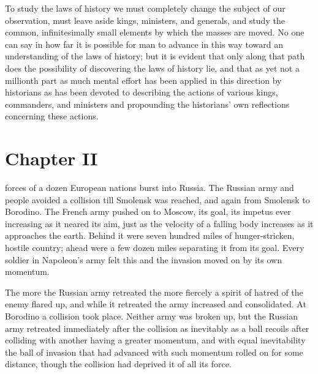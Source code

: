 To study the laws of history we must completely change the
subject of our observation, must leave aside kings, ministers,
and generals, and study the common, infinitesimally small
elements by which the masses are moved. No one can say in how far
it is possible for man to advance in this way toward an
understanding of the laws of history; but it is evident that only
along that path does the possibility of discovering the laws of
history lie, and that as yet not a millionth part as much mental
effort has been applied in this direction by historians as has
been devoted to describing the actions of various kings,
commanders, and ministers and propounding the historians' own
reflections concerning these actions.


\chapter*{Chapter II} \ifaudio {}
\fi

 forces of a dozen European nations burst into Russia. The
Russian army and people avoided a collision till Smolensk was
reached, and again from Smolensk to Borodino. The French army
pushed on to Moscow, its goal, its impetus ever increasing as it
neared its aim, just as the velocity of a falling body increases
as it approaches the earth. Behind it were seven hundred miles of
hunger-stricken, hostile country; ahead were a few dozen miles
separating it from its goal. Every soldier in Napoleon's army
felt this and the invasion moved on by its own momentum.

The more the Russian army retreated the more fiercely a spirit of
hatred of the enemy flared up, and while it retreated the army
increased and consolidated. At Borodino a collision took
place. Neither army was broken up, but the Russian army retreated
immediately after the collision as inevitably as a ball recoils
after colliding with another having a greater momentum, and with
equal inevitability the ball of invasion that had advanced with
such momentum rolled on for some distance, though the collision
had deprived it of all its force.

